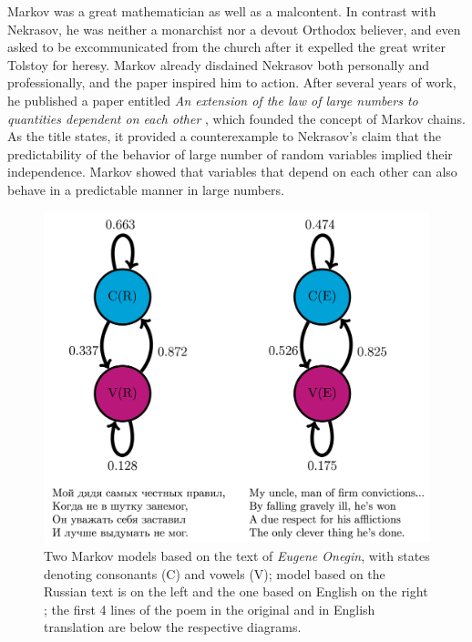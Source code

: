 \documentclass[
]{book}
\theoremstyle{definition}
\theoremstyle{definition}
\theoremstyle{definition}
\theoremstyle{remark}
\begin{document}
Markov was a great mathematician as well as a malcontent. In contrast with Nekrasov, he was neither a monarchist nor a devout Orthodox believer, and even asked to be excommunicated from the church after it expelled the great writer Tolstoy for heresy. Markov already disdained Nekrasov both personally and professionally, and the paper inspired him to action. After several years of work, he published a paper entitled \emph{An extension of the law of large numbers to quantities dependent on each other} \citep{markov_extension_1906}, which founded the concept of Markov chains. As the title states, it provided a counterexample to Nekrasov's claim that the predictability of the behavior of large number of random variables implied their independence. Markov showed that variables that depend on each other can also behave in a predictable manner in large numbers.

\begin{figure}
\centering
\includegraphics{ch12/onegin_markov_diag.png}
\caption{Two Markov models based on the text of \emph{Eugene Onegin}, with states denoting consonants (C) and vowels (V); model based on the Russian text is on the left and the one based on English on the right \citep{hayes_first_2012}; the first 4 lines of the poem in the original \citep{onegin-pushkin} and in English translation \citep{onegin-falen} are below the respective diagrams.}
\end{figure}
\end{document}
